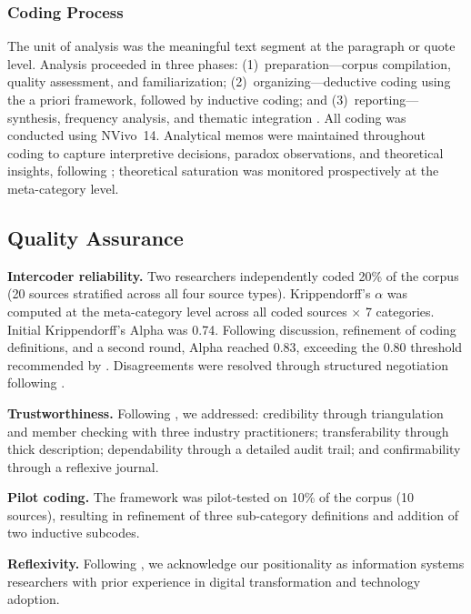 \documentclass[preprint,12pt,authoryear]{elsarticle}
\begin{document}
\subsubsection{Coding Process}

The unit of analysis was the meaningful text segment at the paragraph or quote level. Analysis proceeded in three phases: (1)~preparation---corpus compilation, quality assessment, and familiarization; (2)~organizing---deductive coding using the a priori framework, followed by inductive coding; and (3)~reporting---synthesis, frequency analysis, and thematic integration \citep{Elo2008}. All coding was conducted using NVivo~14. Analytical memos were maintained throughout coding to capture interpretive decisions, paradox observations, and theoretical insights, following \citet{Saldana2021}; theoretical saturation was monitored prospectively at the meta-category level.


\subsection{Quality Assurance}
\label{sec:quality}

\textbf{Intercoder reliability.} Two researchers independently coded 20\% of the corpus (20 sources stratified across all four source types). Krippendorff's $\alpha$ was computed at the meta-category level across all coded sources $\times$ 7 categories. Initial Krippendorff's Alpha was 0.74. Following discussion, refinement of coding definitions, and a second round, Alpha reached 0.83, exceeding the 0.80 threshold recommended by \citet{Krippendorff2019}. Disagreements were resolved through structured negotiation following \citet{Campbell2013}.

\textbf{Trustworthiness.} Following \citet{Lincoln1985}, we addressed: credibility through triangulation and member checking with three industry practitioners; transferability through thick description; dependability through a detailed audit trail; and confirmability through a reflexive journal.

\textbf{Pilot coding.} The framework was pilot-tested on 10\% of the corpus (10 sources), resulting in refinement of three sub-category definitions and addition of two inductive subcodes.

\textbf{Reflexivity.} Following \citet{Nicmanis2024}, we acknowledge our positionality as information systems researchers with prior experience in digital transformation and technology adoption.


\end{document}
